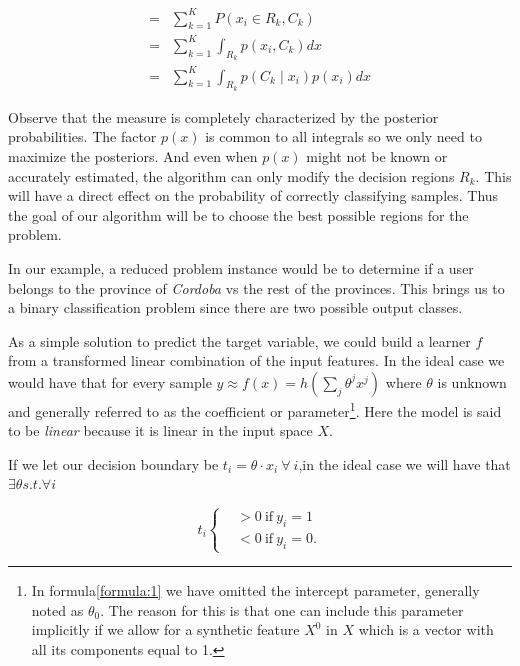 \begin{equation}\label{eq:goodclassification-equation}
\begin{split}
= & \sum_{k=1}^{K} P(x_i \in R_k, C_k ) \\
= & \sum_{k=1}^{K} \int_{R_k}p(x_i,C_k) dx \\
= & \sum_{k=1}^{K} \int_{R_k}p(C_k \mid x_i) p(x_i) dx
\end{split}
\end{equation}

Observe that the measure is completely characterized by the posterior probabilities. The factor $p(x)$ is common to all integrals so we only need to maximize the posteriors. And even when $p(x)$ might not be known or accurately estimated, the algorithm can only modify the decision regions $R_k$. This will have a direct effect on the probability of correctly classifying samples. Thus the goal of our algorithm will be to choose the best possible regions for the problem.

In our example, a reduced problem instance would be to determine if a user belongs to the province of \textit{Cordoba} vs the rest of the provinces. This brings us to a binary classification problem since there are two possible output classes. %

As a simple solution to predict the target variable, we could build a learner $f$ from a transformed linear combination of the input features. In the ideal case we would have that for every sample $y \approx f(x) = h\left(\sum_{j}\theta^j x^j\right)$\label{formula:1} where $\theta$ is unknown and generally referred to as the coefficient or parameter\footnote{In formula\cref{formula:1} we have omitted the intercept parameter, generally noted as $\theta_0$. The reason for this is that one can include this parameter implicitly if we allow for a synthetic feature $X^0$ in $X$ which is a vector with all its components equal to 1.}. Here the model is said to be \textit{linear} because it is linear in the input space $X$.

If we let our decision boundary be $ t_i = \theta \cdot x_i \ \forall \ i $,in the ideal case we will have that $\exists \theta s.t. \forall i $

\begin{equation}
t_i
\begin{cases}
&>0 \ \mbox{if} \ y_i=1 \\
&<0 \ \mbox{if} \ y_i=0.
\end{cases}
\end{equation}

